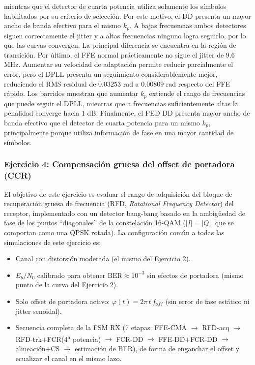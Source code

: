mientras que el detector de cuarta potencia utiliza solamente los símbolos habilitados por su criterio de selección. Por este motivo, el DD presenta un mayor ancho de banda efectivo para el mismo $k_p$.
A bajas frecuencias ambos detectores siguen correctamente el jitter y a altas frecuencias ninguno logra seguirlo, por lo que las curvas convergen. La principal diferencia se encuentra en la región de transición.
Por último, el FFE normal prácticamente no sigue el jitter de $9.6$ MHz. Aumentar su velocidad de adaptación permite reducir parcialmente el error, pero el DPLL presenta un seguimiento considerablemente mejor, reduciendo el RMS residual de $0.03253$ rad a $0.00809$ rad respecto del FFE rápido.
Los barridos muestran que aumentar $k_p$ extiende el rango de frecuencias que puede seguir el DPLL, mientras que a frecuencias suficientemente altas la penalidad converge hacia $1$ dB. Finalmente, el PED DD presenta mayor ancho de banda efectivo que el detector de cuarta potencia para un mismo $k_p$, principalmente porque utiliza información de fase en una mayor cantidad de símbolos.
\subsubsection*{Ejercicio 4: Compensación gruesa del offset de portadora (CCR)}
El objetivo de este ejercicio es evaluar el rango de adquisición del bloque de
recuperación gruesa de frecuencia (RFD, \emph{Rotational Frequency Detector})
del receptor, implementado con un detector bang-bang basado en la ambigüedad
de fase de los puntos ``diagonales'' de la constelación 16-QAM
($|I|=|Q|$, que se comportan como una QPSK rotada).
La configuración común a todas las simulaciones de este ejercicio es:
\begin{itemize}
    \item Canal con distorsión moderada (el mismo del Ejercicio 2).
    \item $E_b/N_0$ calibrado para obtener $\mathrm{BER}\approx 10^{-3}$ sin
          efectos de portadora (mismo punto de la curva del Ejercicio 2).
    \item Solo offset de portadora activo: $\varphi(t) = 2\pi\, t\, f_{off}$
          (sin error de fase estático ni jitter senoidal).
    \item Secuencia completa de la FSM RX (7 etapas: FFE-CMA
          $\rightarrow$ RFD-acq $\rightarrow$ RFD-trk+FCR(4\textsuperscript{a}
          potencia) $\rightarrow$ FCR-DD $\rightarrow$ FFE-DD+FCR-DD
          $\rightarrow$ alineación+CS $\rightarrow$ estimación de BER), de
          forma de enganchar el offset y ecualizar el canal en el mismo lazo.
\end{itemize}
